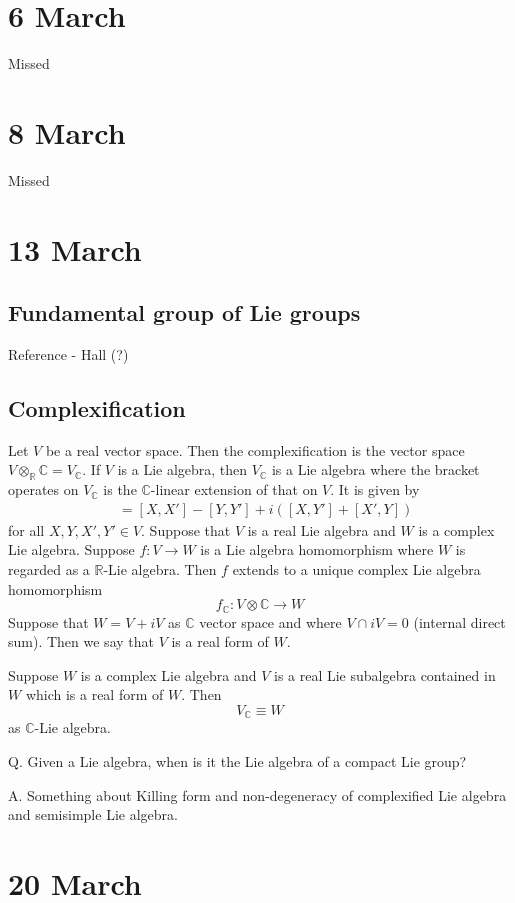 \documentclass[11pt,a4paper]{scrarticle}
\theoremstyle{definition}
\theoremstyle{greenbox}
\newcommand{\R}{\mathbb{R}}
\newcommand{\C}{\mathbb{C}}
\begin{document}
\section{6 March}
Missed
\section{8 March}
Missed
\section{13 March}

\subsection*{Fundamental group of Lie groups}

Reference - Hall (?)

\subsection*{Complexification}
Let $ V $ be a real vector space. Then the complexification is the vector space $ V \otimes_{\R} \C = V_{\C} $. If $ V $ is a Lie algebra, then $ V_{\C} $ is a Lie algebra where the bracket operates on $ V_{\C} $ is the $ \C $-linear extension of that on $ V $. It is given by \begin{align*}
    [X+iY,X'+iY'] & = [X,X']-[Y,Y'] + i \left( [X,Y']+ [X',Y] \right)
\end{align*}
for all $ X,Y,X',Y' \in V $. Suppose that $ V $ is a real Lie algebra and $ W $ is a complex Lie algebra. Suppose $ f:V \to W $ is a Lie algebra homomorphism where $ W $ is regarded as a $ \R $-Lie algebra. Then $ f $ extends to a unique complex Lie algebra homomorphism
\[ f_{\C} : V \otimes \C \to W  \]
Suppose that $ W = V+ iV $ as $ \C$ vector space  and where $ V \cap iV = 0 $ (internal direct sum). Then we say that $ V $ is a real form of $ W $. 

Suppose $ W $ is a complex Lie algebra and $ V $ is a real Lie subalgebra contained in $ W $ which is a real form of $ W $. Then 
\[ V_{\C} \equiv W \]
as $ \C $-Lie algebra.

Q. Given a Lie algebra, when is it the Lie algebra of a compact Lie group? 

A. Something about Killing form and non-degeneracy of complexified Lie algebra and semisimple Lie algebra.

\section{20 March}
\end{document}
